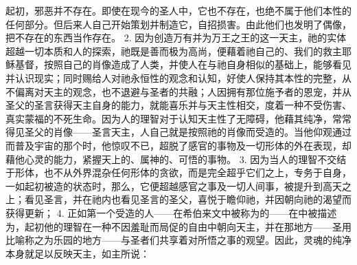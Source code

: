 \par

起初，邪恶并不存在。即使在现今的圣人中，它也不存在，也绝不属于他们本性的任何部分。但后来人自己开始策划并制造它，自招损害。由此他们也发明了偶像，把不存在的东西当作存在。 2. 因为创造万有并为万王之王的这一天主，祂的实体超越一切本质和人的探索，祂既是善而极为高尚，便藉着祂自己的、我们的救主耶稣基督，按照自己的肖像造成了人类，并使人在与祂自身相似的基础上，能够看见并认识现实；同时赐给人对祂永恒性的观念和认知，好使人保持其本性的完整，从不偏离对天主的观念，也不退避与圣者的共融；人因拥有那位施予者的恩宠，并从圣父的圣言获得天主自身的能力，就能喜乐并与天主性相交，度着一种不受伤害、真实蒙福的不死生命。因为人的理智对于认知天主性了无障碍，他藉其纯净，常常得见圣父的肖像——圣言天主，人自己就是按照祂的肖像而受造的。当他仰观通过而普及宇宙的那个时，他惊叹不已，超脱了感官的事物及一切形体的外在表现，却藉他心灵的能力，紧握天上的、属神的、可悟的事物。 3. 因为当人的理智不交结于形体，也不从外界混杂任何形体的贪欲，而是完全超乎它们之上，专务于自身，一如起初被造的状态时，那么，它便超越感官之事及一切人间事，被提升到高天之上；看见圣言，并在祂内也看见圣言的圣父，喜悦于瞻仰祂，并因朝向祂的渴望而获得更新； 4. 正如第一个受造的人——在希伯来文中被称为的——在中被描述为，起初他的理智在一种不因羞耻而局促的自由中朝向天主，并在那地方——圣用比喻称之为乐园的地方——与圣者们共享着对所悟之事的观望。因此，灵魂的纯净本身就足以反映天主，如主所说：\par

\par


